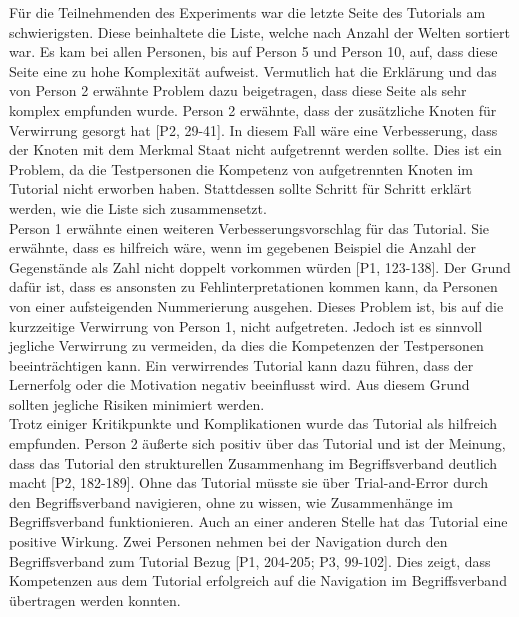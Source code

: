Für die Teilnehmenden des Experiments war die letzte Seite des Tutorials am schwierigsten.
Diese beinhaltete die Liste, welche nach Anzahl der Welten sortiert war.
Es kam bei allen Personen, bis auf Person 5 und Person 10, auf, dass diese Seite eine zu hohe Komplexität aufweist.
Vermutlich hat die Erklärung und das von Person 2 erwähnte Problem dazu beigetragen, dass diese Seite als sehr komplex empfunden wurde.
Person 2 erwähnte, dass der zusätzliche Knoten für Verwirrung gesorgt hat [P2, 29-41].
In diesem Fall wäre eine Verbesserung, dass der Knoten mit dem Merkmal Staat nicht aufgetrennt werden sollte.
Dies ist ein Problem, da die Testpersonen die Kompetenz von aufgetrennten Knoten im Tutorial nicht erworben haben.
Stattdessen sollte Schritt für Schritt erklärt werden, wie die Liste sich zusammensetzt.\\

Person 1 erwähnte einen weiteren Verbesserungsvorschlag für das Tutorial.
Sie erwähnte, dass es hilfreich wäre, wenn im gegebenen Beispiel die Anzahl der Gegenstände als Zahl nicht doppelt vorkommen würden [P1, 123-138].
Der Grund dafür ist, dass es ansonsten zu Fehlinterpretationen kommen kann, da Personen von einer aufsteigenden Nummerierung ausgehen.
Dieses Problem ist, bis auf die kurzzeitige Verwirrung von Person 1, nicht aufgetreten.
Jedoch ist es sinnvoll jegliche Verwirrung zu vermeiden, da dies die Kompetenzen der Testpersonen beeinträchtigen kann.
Ein verwirrendes Tutorial kann dazu führen, dass der Lernerfolg oder die Motivation negativ beeinflusst wird.
Aus diesem Grund sollten jegliche Risiken minimiert werden. \\

Trotz einiger Kritikpunkte und Komplikationen wurde das Tutorial als hilfreich empfunden.
Person 2 äußerte sich positiv über das Tutorial und ist der Meinung, dass das Tutorial den strukturellen Zusammenhang im Begriffsverband deutlich macht [P2, 182-189].
Ohne das Tutorial müsste sie über Trial-and-Error durch den Begriffsverband navigieren, ohne zu wissen, wie Zusammenhänge im Begriffsverband funktionieren.
Auch an einer anderen Stelle hat das Tutorial eine positive Wirkung.
Zwei Personen nehmen bei der Navigation durch den Begriffsverband zum Tutorial Bezug [P1, 204-205; P3, 99-102].
Dies zeigt, dass Kompetenzen aus dem Tutorial erfolgreich auf die Navigation im Begriffsverband übertragen werden konnten.\\

